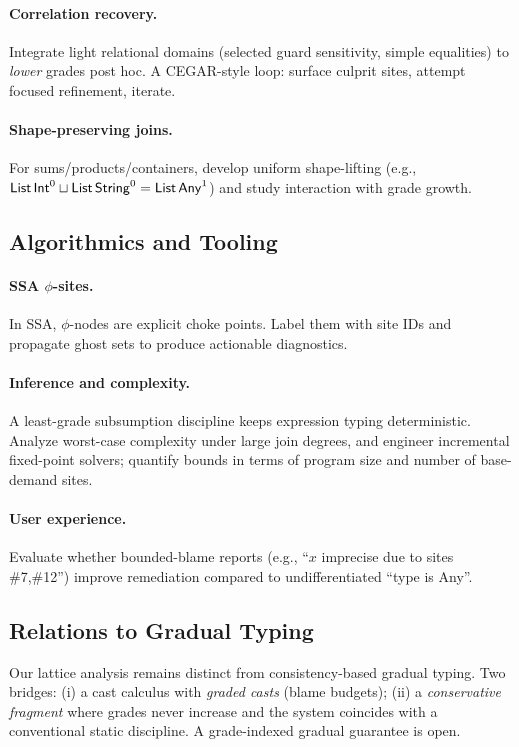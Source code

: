 \paragraph{Correlation recovery.}
Integrate light relational domains (selected guard sensitivity, simple equalities) to \emph{lower} grades post hoc. A CEGAR-style loop: surface culprit sites, attempt focused refinement, iterate.

\paragraph{Shape-preserving joins.}
For sums/products/containers, develop uniform shape-lifting (e.g., $\mathsf{List}\,\mathsf{Int}^0 \sqcup \mathsf{List}\,\mathsf{String}^0 = \mathsf{List}\,\mathsf{Any}^{1}$) and study interaction with grade growth.

\subsection{Algorithmics and Tooling}
\paragraph{SSA $\phi$-sites.}
In SSA, $\phi$-nodes are explicit choke points. Label them with site IDs and propagate ghost sets to produce actionable diagnostics.

\paragraph{Inference and complexity.}
A least-grade subsumption discipline keeps expression typing deterministic. Analyze worst-case complexity under large join degrees, and engineer incremental fixed-point solvers; quantify bounds in terms of program size and number of base-demand sites.

\paragraph{User experience.}
Evaluate whether bounded-blame reports (e.g., “$x$ imprecise due to sites \#7,\#12”) improve remediation compared to undifferentiated ``type is Any''.

\subsection{Relations to Gradual Typing}
Our lattice analysis remains distinct from consistency-based gradual typing. Two bridges: (i) a cast calculus with \emph{graded casts} (blame budgets); (ii) a \emph{conservative fragment} where grades never increase and the system coincides with a conventional static discipline. A grade-indexed gradual guarantee is open.

